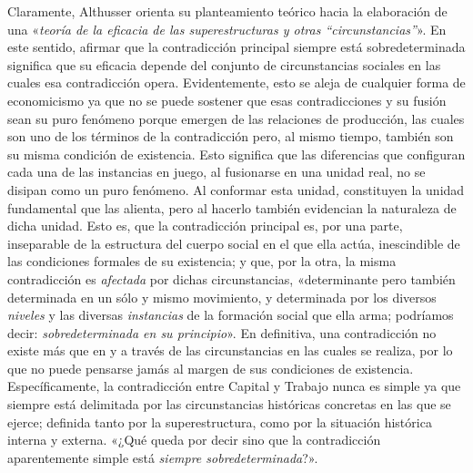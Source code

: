 Claramente, Althusser orienta su planteamiento teórico hacia la elaboración de una «\emph{teoría de la eficacia de las superestructuras y otras ``circunstancias''}». En este sentido, afirmar que la contradicción principal siempre está sobredeterminada significa que su eficacia depende del conjunto de circunstancias sociales en las cuales esa contradicción opera. Evidentemente, esto se aleja de cualquier forma de economicismo ya que no se puede sostener que esas contradicciones y su fusión sean su puro fenómeno porque emergen de las relaciones de producción, las cuales son uno de los términos de la contradicción pero, al mismo tiempo, también son su misma condición de existencia. Esto significa que las diferencias que configuran cada una de las instancias en juego, al fusionarse en una unidad real, no se disipan como un puro fenómeno. Al conformar esta unidad\emph{, }constituyen la unidad fundamental que las alienta, pero al hacerlo también evidencian la naturaleza de dicha unidad. Esto es, que la contradicción principal es, por una parte, inseparable de la estructura del cuerpo social en el que ella actúa, inescindible de las condiciones formales de su existencia; y que, por la otra, la misma contradicción es \emph{afectada} por dichas circunstancias, «determinante pero también determinada en un sólo y mismo movimiento, y determinada por los diversos \emph{niveles} y las diversas \emph{instancias} de la formación social que ella arma; podríamos decir: \emph{sobredeterminada en su principio}». En definitiva, una contradicción no existe más que en y a través de las circunstancias en las cuales se realiza, por lo que no puede pensarse jamás al margen de sus condiciones de existencia. Específicamente, la contradicción entre Capital y Trabajo nunca es simple ya que siempre está delimitada por las circunstancias históricas concretas en las que se ejerce; definida tanto por la superestructura, como por la situación histórica interna y externa. «¿Qué queda por decir sino que la contradicción aparentemente simple está \emph{siempre sobredeterminada}?».

